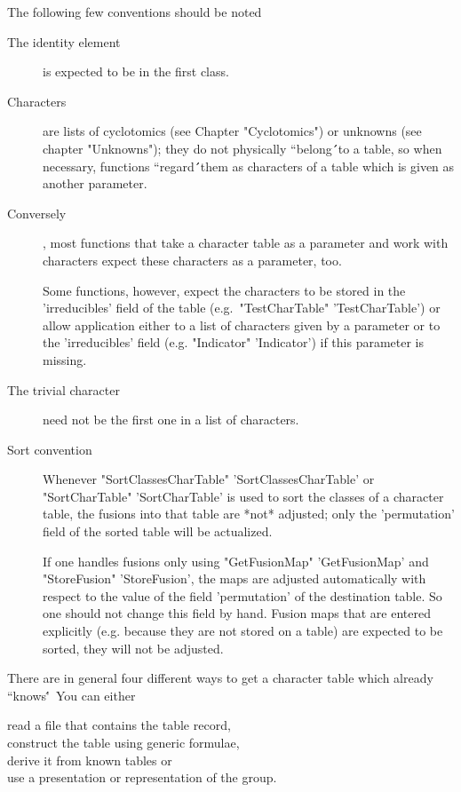 The following few conventions should be noted\:
\begin{description}
\item[The identity element] is expected to be in the first class.
\item[Characters] are lists of cyclotomics (see Chapter "Cyclotomics")
      or unknowns (see chapter "Unknowns");
      they do not physically ``belong\'\'\ to a
      table, so when necessary, functions ``regard\'\'\ them as
      characters of a table which is given as another parameter.
\item[Conversely], most functions that take a character table as a
      parameter and work with characters expect these characters as a
      parameter, too.

      Some functions, however, expect the characters to be stored in the
      'irreducibles' field of the table (e.g.\ "TestCharTable"
      'TestCharTable')
      or allow application either to a list of characters given by a
      parameter or to the 'irreducibles' field (e.g. "Indicator"
      'Indicator') if this parameter is missing.
\item[The trivial character] need not be the first one in a list of
      characters.
\item[Sort convention\:]
      Whenever "SortClassesCharTable" 'SortClassesCharTable' or
      "SortCharTable" 'SortCharTable' is used to sort the classes of a
      character table, the fusions into that table are *not* adjusted;
      only the 'permutation' field of the sorted table will be
      actualized.

      If one handles fusions only using "GetFusionMap" 'GetFusionMap' and
      "StoreFusion" 'StoreFusion', the maps are adjusted automatically
      with respect to the value of the field 'permutation' of the
      destination table.  So one should not change this field by hand.
      Fusion maps that are entered explicitly (e.g. because they are not
      stored on a table) are expected to be sorted, they will not be
      adjusted.
\end{description}

%
%
%
%

There are in general four different ways to get a character table which
{\GAP} already ``knows\'\'\:\ You can either

read a file that contains the table record,\\
construct the table using generic formulae,\\
derive it from known tables or\\
use a presentation or representation of the group.

